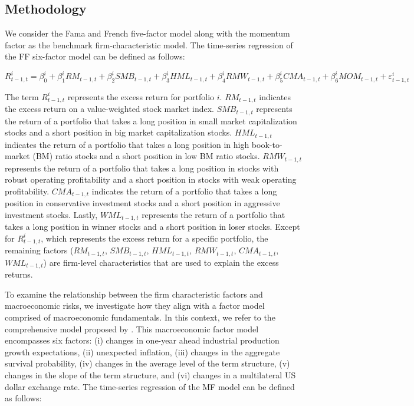 \documentclass[11pt,halfline,a4paper]{ouparticle}
\begin{document}
\subsection{Methodology}
\label{method}

We consider the Fama and French five-factor model \citep{fama2015five} along with the momentum factor \citep{carhart1997persistence} as the benchmark firm-characteristic model. The time-series regression of the FF six-factor model can be defined as follows:

\begin{equation}
    R^i_{t-1,t} = \beta^i_0 + \beta^i_1 RM_{t-1,t} + \beta^i_2 SMB_{t-1,t} + \beta^i_3 HML_{t-1,t} + \beta^i_4 RMW_{t-1,t} + \beta^i_5 CMA_{t-1,t} + \beta^i_6 MOM_{t-1,t} + \varepsilon^i_{t-1,t}
\end{equation}

The term $R^i_{t-1,t}$ represents the excess return for portfolio $i$. $RM_{t-1,t}$ indicates the excess return on a value-weighted stock market index. $SMB_{t-1,t}$ represents the return of a portfolio that takes a long position in small market capitalization stocks and a short position in big market capitalization stocks. $HML_{t-1,t}$ indicates the return of a portfolio that takes a long position in high book-to-market (BM) ratio stocks and a short position in low BM ratio stocks. $RMW_{t-1,t}$ represents the return of a portfolio that takes a long position in stocks with robust operating profitability and a short position in stocks with weak operating profitability. $CMA_{t-1,t}$ indicates the return of a portfolio that takes a long position in conservative investment stocks and a short position in aggressive investment stocks. Lastly, $WML_{t-1,t}$ represents the return of a portfolio that takes a long position in winner stocks and a short position in loser stocks. Except for $R^i_{t-1,t}$, which represents the excess return for a specific portfolio, the remaining factors ($RM_{t-1,t}$, $SMB_{t-1,t}$, $HML_{t-1,t}$, $RMW_{t-1,t}$, $CMA_{t-1,t}$, $WML_{t-1,t}$) are firm-level characteristics that are used to explain the excess returns.

To examine the relationship between the firm characteristic factors and macroeconomic risks, we investigate how they align with a factor model comprised of macroeconomic fundamentals. In this context, we refer to the comprehensive model proposed by \cite{aretz2010macroeconomic}. This macroeconomic factor model encompasses six factors: (i) changes in one-year ahead industrial production growth expectations, (ii) unexpected inflation, (iii) changes in the aggregate survival probability, (iv) changes in the average level of the term structure, (v) changes in the slope of the term structure, and (vi) changes in a multilateral US dollar exchange rate. The time-series regression of the MF model can be defined as follows:
\end{document}
